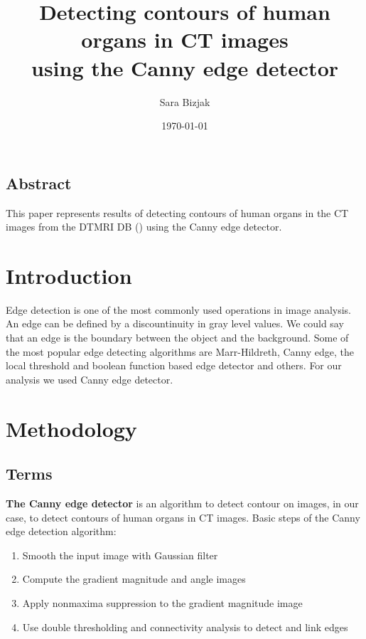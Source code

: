 \documentclass[a4paper,11pt]{article}
\title{ Detecting contours of human organs in CT images \\ 
using the Canny edge detector }
\author{Sara Bizjak}
\date{\today}
\begin{document}
\maketitle

\begin{center}
\section*{Abstract}
\end{center}
This paper represents results of detecting contours of human organs in the CT images from the DTMRI DB (\cite{bib:db}) using the Canny edge detector.

\section{Introduction}

Edge detection is one of the most commonly used operations in image analysis. 
An edge can be defined by a discountinuity in gray level values. We could say that an edge is the boundary between the object and the background. 
Some of the most popular edge detecting algorithms are Marr-Hildreth, Canny edge, the local threshold and boolean function based edge detector and others.
For our analysis we used Canny edge detector.



\section{Methodology}


\subsection{Terms}

\textbf{The Canny edge detector} is an algorithm to detect contour on images, in our case, to detect contours of human organs in CT images.
Basic steps of the Canny edge detection algorithm:
\begin{enumerate}
    \item Smooth the input image with Gaussian filter
    \item Compute the gradient magnitude and angle images
    \item Apply nonmaxima suppression to the gradient magnitude image
    \item Use double thresholding and connectivity analysis to detect and link edges
\end{enumerate}
\end{document}
